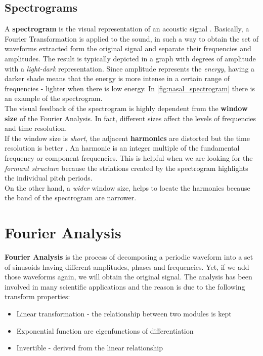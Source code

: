 \subsection{Spectrograms}
\label{sec:spectrograms}
A \textbf{spectrogram} is the visual representation of an acoustic signal \cite{spectrogram_def}. Basically, a Fourier Transformation is applied to the sound, in such a way to obtain the set of waveforms extracted form the original signal and separate their frequencies and amplitudes. The result is typically depicted in a graph with degrees of amplitude with a \textit{light-dark} representation. Since amplitude represents the \textit{energy}, having a darker shade means that the energy is more intense in a certain range of frequencies - lighter when there is low energy. In \ref{fig:nasal_spectrogram} there is an example of the spectrogram. \\
\noindent The visual feedback of the spectrogram is highly dependent from the \textbf{window size} of the Fourier Analysis. In fact, different sizes affect the levels of frequencies and time resolution. \\
\noindent If the window size is \textit{short}, the adjacent \textbf{harmonics} are distorted but the time resolution is better \cite{spectrogram_def}. An harmonic is an integer multiple of the fundamental frequency or component frequencies. This is helpful when we are looking for the \textit{formant structure} because the striations created by the spectrogram highlights the individual pitch periods. \\
\noindent On the other hand, a \textit{wider} window size, helps to locate the harmonics because the band of the spectrogram are narrower.


\section{Fourier Analysis}
\label{sec:fourier_analysis}
\textbf{Fourier Analysis} is the process of decomposing a periodic waveform into a set of sinusoids having different amplitudes, phases and frequencies. Yet, if we add those waveforms again, we will obtain the original signal. The analysis has been involved in many scientific applications and the reason is due to the following transform properties:

\begin{itemize}
	\item Linear transformation - the relationship between two modules is kept
	\item Exponential function are eigenfunctions of differentiation \cite{evans1997partial}
	\item Invertible - derived from the linear relationship
\end{itemize}

